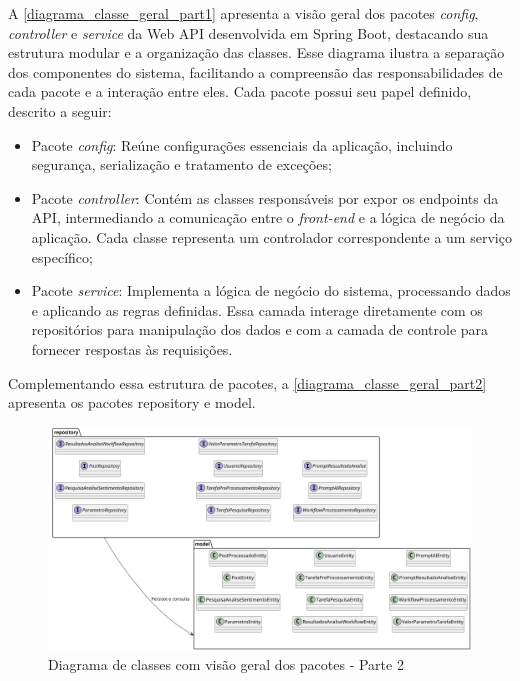 \documentclass[
	12pt,				%
	oneside,			%
	a4paper,			%
	english,			%
	french,				%
	spanish,			%
	brazil				%
	]{abntex2}
\begin{document}
A \autoref{diagrama_classe_geral_part1} apresenta a visão geral dos
pacotes \emph{config}, \emph{controller} e \emph{service} da Web API
desenvolvida em Spring Boot, destacando sua estrutura modular e a
organização das classes. Esse diagrama ilustra a separação dos
componentes do sistema, facilitando a compreensão das responsabilidades
de cada pacote e a interação entre eles. Cada pacote possui seu papel
definido, descrito a seguir:

\begin{itemize}
\tightlist
\item
  Pacote \emph{config}: Reúne configurações essenciais da aplicação,
  incluindo segurança, serialização e tratamento de exceções;
\item
  Pacote \emph{controller}: Contém as classes responsáveis por expor os
  endpoints da API, intermediando a comunicação entre o \emph{front-end}
  e a lógica de negócio da aplicação. Cada classe representa um
  controlador correspondente a um serviço específico;
\item
  Pacote \emph{service}: Implementa a lógica de negócio do sistema,
  processando dados e aplicando as regras definidas. Essa camada
  interage diretamente com os repositórios para manipulação dos dados e
  com a camada de controle para fornecer respostas às requisições.
\end{itemize}

Complementando essa estrutura de pacotes, a
\autoref{diagrama_classe_geral_part2} apresenta os pacotes repository e
model.

\begin{figure}[htbp]
\hypertarget{diagrama_classe_geral_part2}{%
\caption{Diagrama de classes com visão geral dos pacotes - Parte 2}\label{diagrama_classe_geral_part2}
\begin{center}
\includegraphics[scale=0.43]{imagens/sentilytics/diagramas/classes/diagrama-classe-visao-geral-pacotes-part2.png}
\end{center}
}
\end{figure}
\end{document}
